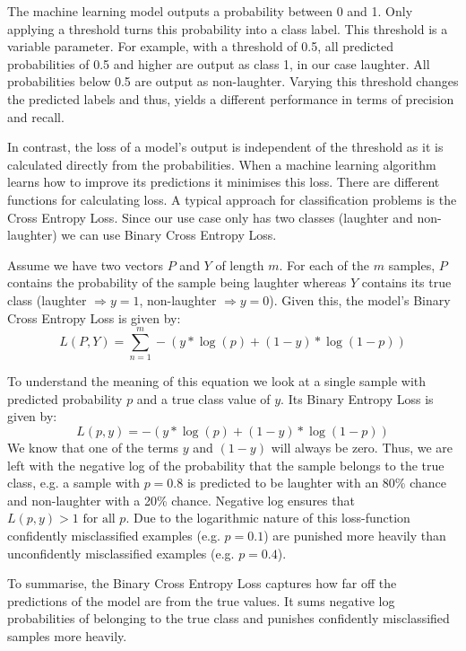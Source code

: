\documentclass[bsc,frontabs,parskip,deptreport]{infthesis}
\begin{document}
The machine learning model outputs a probability between 0 and 1. Only applying a threshold turns this probability into a class label. This threshold is a variable parameter.
For example, with a threshold of 0.5, all predicted probabilities of 0.5 and higher are output as class 1, in our case laughter. All probabilities below 0.5 are output as non-laughter. 
Varying this threshold changes the predicted labels and thus, yields a different performance in terms of precision and recall. 

In contrast, the loss of a model's output is independent of the threshold as it is calculated directly from the probabilities.
When a machine learning algorithm learns how to improve its predictions it minimises this loss. There are different functions for calculating loss.
A typical approach for classification problems is the Cross Entropy Loss. Since our use case only has two classes (laughter and non-laughter) we can use Binary Cross Entropy Loss. 

Assume we have two vectors $P$ and $Y$ of length $m$. For each of the $m$ samples, $P$ contains the probability of the sample being laughter whereas $Y$ contains its true class (laughter $\Rightarrow y=1$, non-laughter $ \Rightarrow y=0$).
Given this, the model's Binary Cross Entropy Loss is given by:
$$ L(P,Y) = \sum_{n=1}^{m}  -{(y*\log(p) + (1 - y)*\log(1 - p))}$$

To understand the meaning of this equation we look at a single sample with predicted probability $p$ and a true class value of $y$. Its Binary Entropy Loss is given by: 
$$ L(p,y) = -{(y*\log(p) + (1 - y)*\log(1 - p))} $$
We know that one of the terms $y$ and $(1-y)$ will always be zero.
Thus, we are left with the negative log of the probability that the sample belongs to the true class, e.g. a sample with $p=0.8$ is predicted to be laughter with an 80\% chance and non-laughter with a 20\% chance. Negative log ensures that $L(p,y) > 1  \textrm{ for all } p $. 
Due to the logarithmic nature of this loss-function confidently misclassified examples (e.g. $p=0.1$) are punished more heavily than unconfidently misclassified examples (e.g. $p=0.4$).

To summarise, the Binary Cross Entropy Loss captures how far off the predictions of the model are from the true values. It sums negative log probabilities of belonging to the true class and punishes confidently misclassified samples more heavily.

%
\end{document}
